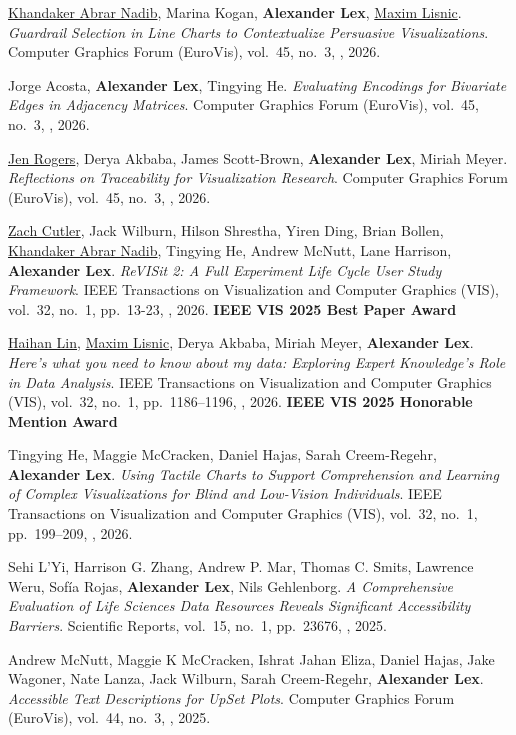 \item \uline{Khandaker Abrar Nadib}, Marina Kogan, \textbf{Alexander Lex}, \uline{Maxim Lisnic}. \textit{Guardrail Selection in Line Charts to Contextualize Persuasive Visualizations}. Computer Graphics Forum (EuroVis), vol.\ 45, no.\ 3, , 2026. 
\item Jorge Acosta, \textbf{Alexander Lex}, Tingying He. \textit{Evaluating Encodings for Bivariate Edges in Adjacency Matrices}. Computer Graphics Forum (EuroVis), vol.\ 45, no.\ 3, , 2026. 
\item \uline{Jen Rogers}, Derya Akbaba, James Scott-Brown, \textbf{Alexander Lex}, Miriah Meyer. \textit{Reflections on Traceability for Visualization Research}. Computer Graphics Forum (EuroVis), vol.\ 45, no.\ 3, , 2026. 
\item \uline{Zach Cutler}, Jack Wilburn, Hilson Shrestha, Yiren Ding, Brian Bollen, \uline{Khandaker Abrar Nadib}, Tingying He, Andrew McNutt, Lane Harrison, \textbf{Alexander Lex}. \textit{ReVISit 2: A Full Experiment Life Cycle User Study Framework}. IEEE Transactions on Visualization and Computer Graphics (VIS), vol.\ 32, no.\ 1, pp.\ 13-23, , 2026. \textbf{IEEE VIS 2025 Best Paper Award}
\item \uline{Haihan Lin}, \uline{Maxim Lisnic}, Derya Akbaba, Miriah Meyer, \textbf{Alexander Lex}. \textit{Here's what you need to know about my data: Exploring Expert Knowledge's Role in Data Analysis}. IEEE Transactions on Visualization and Computer Graphics (VIS), vol.\ 32, no.\ 1, pp.\ 1186--1196, , 2026. \textbf{IEEE VIS 2025 Honorable Mention Award}
\item Tingying He, Maggie McCracken, Daniel Hajas, Sarah Creem-Regehr, \textbf{Alexander Lex}. \textit{Using Tactile Charts to Support Comprehension and Learning of Complex Visualizations for Blind and Low-Vision Individuals}. IEEE Transactions on Visualization and Computer Graphics (VIS), vol.\ 32, no.\ 1, pp.\ 199--209, , 2026. 
\item Sehi L'Yi, Harrison G. Zhang, Andrew P. Mar, Thomas C. Smits, Lawrence Weru, Sofía Rojas, \textbf{Alexander Lex}, Nils Gehlenborg. \textit{A Comprehensive Evaluation of Life Sciences Data Resources Reveals Significant Accessibility Barriers}. Scientific Reports, vol.\ 15, no.\ 1, pp.\ 23676, , 2025. 
\item Andrew McNutt, Maggie K McCracken, Ishrat Jahan Eliza, Daniel Hajas, Jake Wagoner, Nate Lanza, Jack Wilburn, Sarah Creem-Regehr, \textbf{Alexander Lex}. \textit{Accessible Text Descriptions for UpSet Plots}. Computer Graphics Forum (EuroVis), vol.\ 44, no.\ 3, , 2025. 
